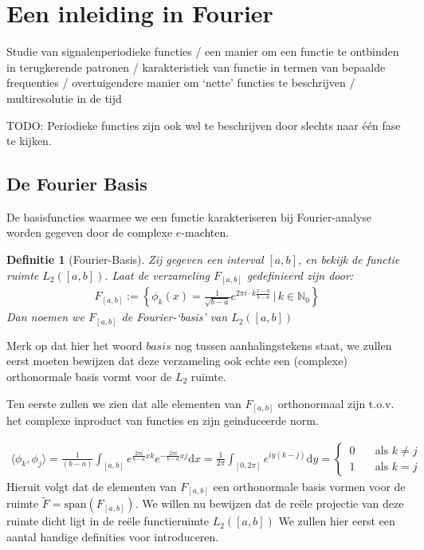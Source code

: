 \documentclass[11pt]{amsart}
\newcommand{\N}{\mathbb{N}}
\newtheorem*{definitie}{Definitie}
\theoremstyle{remark}
\newcommand{\eq}[1]{\begin{eqnarray*} #1 \end{eqnarray*}}
\newcommand{\dx}{\text{d}x}
\newcommand{\dy}{\text{d}y}
\newcommand{\largediv}{\,\big|\,}
\newcommand{\inpr}[2]{\langle #1 , #2 \rangle}
\begin{document}
\section{Een inleiding in Fourier}
Studie van signalenperiodieke functies / 
een manier om een functie te ontbinden in terugkerende patronen /
karakteristiek van functie in termen van bepaalde frequenties /
overtuigendere manier om `nette' functies te beschrijven /
multiresolutie in de tijd

TODO: Periodieke functies zijn ook wel te beschrijven door slechts naar \'e\'en fase te kijken.

\subsection*{De Fourier Basis}
De basisfuncties waarmee we een functie karakteriseren bij Fourier-analyse worden gegeven door de complexe
$e$-machten.
\begin{definitie}[Fourier-Basis] Zij gegeven een interval $[a,b]$, en bekijk de functie ruimte $L_2([a,b])$. Laat de verzameling $F_{[a,b]}$ gedefinieerd zijn door:
\eq{
  F_{[a,b]} := \left\{ \phi_k(x) = \tfrac{1}{\sqrt{b-a}} e^{2 \pi i \cdot k \frac{x-a}{b-a}} \largediv k \in \N_0 \right\}
}
Dan noemen we $F_{[a,b]}$ de Fourier-`basis' van $L_2([a,b])$
\end{definitie}
Merk op dat hier het woord $basis$ nog tussen aanhalingstekens staat, we zullen eerst moeten bewijzen dat deze
verzameling ook echte een (complexe) orthonormale basis vormt voor de $L_2$ ruimte.

Ten eerste zullen we zien dat alle elementen van $F_{[a,b]}$ orthonormaal zijn t.o.v. het complexe inproduct van functies en zijn geinduceerde norm.

\eq{
  \inpr{\phi_k}{\phi_j} = \frac{1}{(b-a)}\int_{[a,b]} e^{\frac{2\pi i}{b-a} x k} 
                                                             e^{-\frac{2\pi i }{b-a} x j} \dx
                        = \frac{1}{2\pi}\int_{[0,2\pi]} e^{iy(k-j)} \dy =
                          \begin{cases}
                            \,0&\quad \text{als } k\neq j \\
                            \,1&\quad \text{als } k=j
                          \end{cases}
}
Hieruit volgt dat de elementen van $F_{[a,b]}$ een orthonormale basis vormen voor de ruimte $\tilde F = \text{span}(F_{[a,b]})$.
We willen nu bewijzen dat de re\"ele projectie van deze ruimte dicht ligt in de re\"ele functieruimte $L_2([a,b])$
We zullen hier eerst een aantal handige definities voor introduceren.
\end{document}
